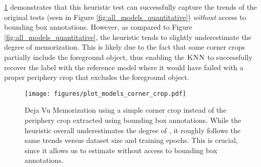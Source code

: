 \cref{corner crop} demonstrates that this heuristic test can successfully capture the trends of the original tests (seen in Figure \ref{fig:all_models_quantitative}) \emph{without} access to bounding box annotations. However, as compared to Figure \ref{fig:all_models_quantitative}, the heuristic tends to slightly underestimate the degree of memorization. This is likely due to the fact that some corner crops partially include the foreground object, thus enabling the $\textsc{KNN}$ to successfully recover the label with the reference model where it would have failed with a proper periphery crop that excludes the foreground object. 

\begin{figure}[ht]
\captionsetup[subfigure]{font=scriptsize,labelfont=scriptsize}
     \centering
     \texttt{[image: figures/plot\_models\_corner\_crop.pdf]}
\caption{
Deja Vu Memorization using a simple corner crop instead of the periphery crop extracted using bounding box annotations. While the heuristic overall underestimates the degree of \dejavu, it roughly follows the same trends versus dataset size and training epochs. This is crucial, since it allows us to estimate \dejavu without access to bounding box annotations. 
}
\label{corner crop}
\end{figure}
 